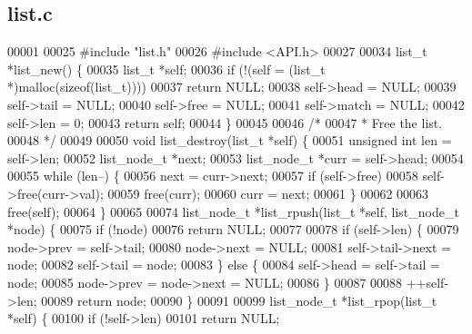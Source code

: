 \subsection{list.\+c}
\label{list_8c_source}

\begin{DoxyCode}
00001 
00025 \textcolor{preprocessor}{#include "list.h"}
00026 \textcolor{preprocessor}{#include <API.h>}
00027 
00034 list_t *list_new() \{
00035   list_t *\textcolor{keyword}{self};
00036   \textcolor{keywordflow}{if} (!(\textcolor{keyword}{self} = (list_t *)malloc(\textcolor{keyword}{sizeof}(list_t))))
00037     \textcolor{keywordflow}{return} NULL;
00038   \textcolor{keyword}{self}->head = NULL;
00039   \textcolor{keyword}{self}->tail = NULL;
00040   \textcolor{keyword}{self}->free = NULL;
00041   \textcolor{keyword}{self}->match = NULL;
00042   \textcolor{keyword}{self}->len = 0;
00043   \textcolor{keywordflow}{return} \textcolor{keyword}{self};
00044 \}
00045 
00046 \textcolor{comment}{/*}
00047 \textcolor{comment}{ * Free the list.}
00048 \textcolor{comment}{ */}
00049 
00050 \textcolor{keywordtype}{void} list_destroy(list_t *\textcolor{keyword}{self}) \{
00051   \textcolor{keywordtype}{unsigned} \textcolor{keywordtype}{int} len = \textcolor{keyword}{self}->len;
00052   list_node_t *next;
00053   list_node_t *curr = \textcolor{keyword}{self}->head;
00054 
00055   \textcolor{keywordflow}{while} (len--) \{
00056     next = curr->next;
00057     \textcolor{keywordflow}{if} (self->free)
00058       \textcolor{keyword}{self}->free(curr->val);
00059     free(curr);
00060     curr = next;
00061   \}
00062 
00063   free(\textcolor{keyword}{self});
00064 \}
00065 
00074 list_node_t *list_rpush(list_t *\textcolor{keyword}{self}, list_node_t *node) \{
00075   \textcolor{keywordflow}{if} (!node)
00076     \textcolor{keywordflow}{return} NULL;
00077 
00078   \textcolor{keywordflow}{if} (self->len) \{
00079     node->prev = \textcolor{keyword}{self}->tail;
00080     node->next = NULL;
00081     \textcolor{keyword}{self}->tail->next = node;
00082     \textcolor{keyword}{self}->tail = node;
00083   \} \textcolor{keywordflow}{else} \{
00084     \textcolor{keyword}{self}->head = \textcolor{keyword}{self}->tail = node;
00085     node->prev = node->next = NULL;
00086   \}
00087 
00088   ++\textcolor{keyword}{self}->len;
00089   \textcolor{keywordflow}{return} node;
00090 \}
00091 
00099 list_node_t *list_rpop(list_t *\textcolor{keyword}{self}) \{
00100   \textcolor{keywordflow}{if} (!self->len)
00101     \textcolor{keywordflow}{return} NULL;

\end{DoxyCode}
